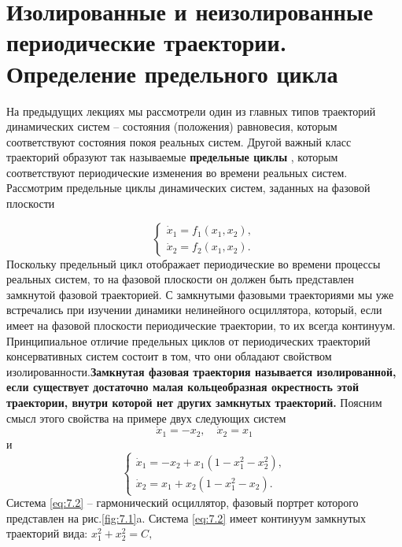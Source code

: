\section{Изолированные и неизолированные периодические траектории. Определение предельного цикла}%
\label{sec:7.1}

На предыдущих лекциях мы рассмотрели один из главных типов
траекторий динамических систем – состояния (положения) равновесия,
которым соответствуют состояния покоя реальных систем. Другой важный
класс траекторий образуют так называемые \textbf{предельные циклы} , которым
соответствуют периодические изменения во времени реальных систем.
Рассмотрим предельные циклы динамических систем, заданных на фазовой
плоскости

\begin{equation}
        \label{eq:7.1}
        \begin{cases}
                \dot x_1 = f_1(x_1,x_2), \\
                \dot x_2 = f_2(x_1,x_2). 
        \end{cases}
\end{equation}
Поскольку предельный цикл отображает периодические во времени процессы
реальных систем, то на фазовой плоскости он должен быть представлен
замкнутой фазовой траекторией. С замкнутыми фазовыми траекториями мы
уже встречались при изучении динамики нелинейного осциллятора, который,
если имеет на фазовой плоскости периодические траектории, то их всегда
континуум. Принципиальное отличие предельных циклов от периодических
траекторий консервативных систем состоит в том, что они обладают свойством
изолированности.\textbf{Замкнутая фазовая траектория называется
изолированной, если существует достаточно малая кольцеобразная
окрестность этой траектории, внутри которой нет других замкнутых
траекторий.} Поясним смысл этого свойства на примере двух следующих
систем
\begin{equation}
        \label{eq:7.2}
        \dot x_1 = -x_2,\quad \dot x_2 = x_1
\end{equation}
и
\begin{equation}
        \label{eq:7.3}
        \begin{cases}
                \dot x_1 = -x_2 + x_1(1-x_1^2 - x_2^2), \\
                \dot x_2 = x_1 +x_2(1-x_1^2 - x_2 ).      
        \end{cases}
\end{equation}
Система \eqref{eq:7.2} -- гармонический осциллятор, фазовый портрет которого представлен на рис.\ref{fig:7.1}a. Система \eqref{eq:7.2} имеет континуум замкнутых траекторий вида: $x_1^2+x_2^2 = C,$ 
